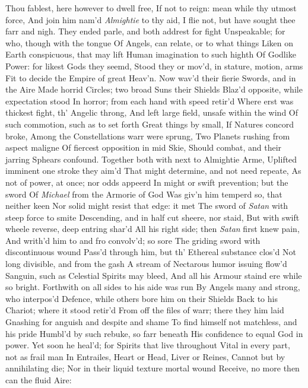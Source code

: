 \documentclass[11pt]{book}
\newcounter {first}
\begin{document}
Thou fablest, here however to dwell free, 
If not to reign: mean while thy utmost force, 
And join him nam'd \textit{Almightie} to thy aid, 
I flie not, but have sought thee farr and nigh. 
\quad They ended parle, and both addrest for fight 
Unspeakable; for who, though with the tongue 
Of Angels, can relate, or to what things 
Liken on Earth conspicuous, that may lift 
Human imagination to such highth 
Of Godlike Power: for likest Gods they seemd, 
Stood they or mov'd, in stature, motion, arms 
Fit to decide the Empire of great Heav'n. 
Now wav'd their fierie Swords, and in the Aire 
Made horrid Circles; two broad Suns their Shields 
Blaz'd opposite, while expectation stood 
In horror; from each hand with speed retir'd 
Where erst was thickest fight, th' Angelic throng, 
And left large field, unsafe within the wind 
Of such commotion, such as to set forth 
Great things by small, If Natures concord broke, 
Among the Constellations warr were sprung, 
Two Planets rushing from aspect maligne 
Of fiercest opposition in mid Skie, 
Should combat, and their jarring Sphears confound. 
Together both with next to Almightie Arme, 
Uplifted imminent one stroke they aim'd 
That might determine, and not need repeate, 
As not of power, at once; nor odds appeerd 
In might or swift prevention; but the sword 
Of \textit{Michael} from the Armorie of God 
Was giv'n him temperd so, that neither keen 
Nor solid might resist that edge: it met 
The sword of \textit{Satan} with steep force to smite 
Descending, and in half cut sheere, nor staid, 
But with swift wheele reverse, deep entring shar'd 
All his right side; then \textit{Satan} first knew pain, 
And writh'd him to and fro convolv'd; so sore 
The griding sword with discontinuous wound 
Pass'd through him, but th' Ethereal substance clos'd 
Not long divisible, and from the gash 
A stream of Nectarous humor issuing flow'd 
Sanguin, such as Celestial Spirits may bleed, 
And all his Armour staind ere while so bright. 
Forthwith on all sides to his aide was run 
By Angels many and strong, who interpos'd 
Defence, while others bore him on their Shields 
Back to his Chariot; where it stood retir'd 
From off the files of warr; there they him laid 
Gnashing for anguish and despite and shame 
To find himself not matchless, and his pride 
Humbl'd by such rebuke, so farr beneath 
His confidence to equal God in power. 
Yet soon he heal'd; for Spirits that live throughout 
Vital in every part, not as frail man 
In Entrailes, Heart or Head, Liver or Reines, 
Cannot but by annihilating die; 
Nor in their liquid texture mortal wound 
Receive, no more then can the fluid Aire: 
\end{document}
